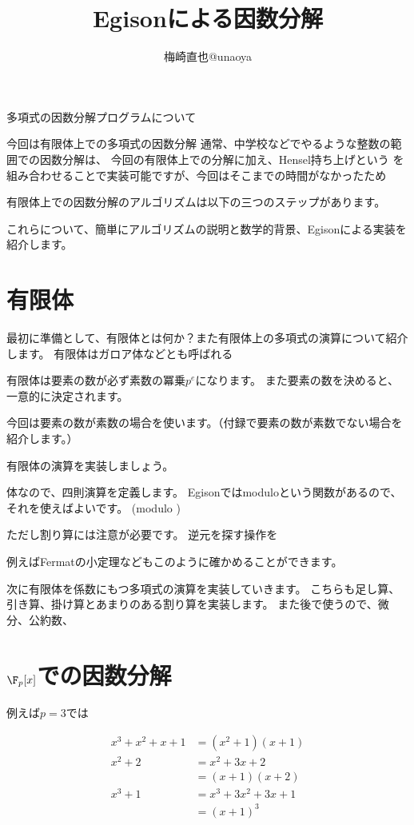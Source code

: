 \documentclass[uplatex]{jsarticle}
\title{Egisonによる因数分解}
\author{梅崎直也@unaoya}
\begin{document}
\maketitle


多項式の因数分解プログラムについて

今回は有限体上での多項式の因数分解
通常、中学校などでやるような整数の範囲での因数分解は、
今回の有限体上での分解に加え、Hensel持ち上げという
を組み合わせることで実装可能ですが、今回はそこまでの時間がなかったため

有限体上での因数分解のアルゴリズムは以下の三つのステップがあります。

これらについて、簡単にアルゴリズムの説明と数学的背景、Egisonによる実装を紹介します。

\section{有限体}
最初に準備として、有限体とは何か？また有限体上の多項式の演算について紹介します。
有限体はガロア体などとも呼ばれる

有限体は要素の数が必ず素数の冪乗$p^e$になります。
また要素の数を決めると、一意的に決定されます。

今回は要素の数が素数の場合を使います。（付録で要素の数が素数でない場合を紹介します。）

有限体の演算を実装しましょう。

体なので、四則演算を定義します。
Egisonではmoduloという関数があるので、それを使えばよいです。
(modulo )

ただし割り算には注意が必要です。
逆元を探す操作を

例えばFermatの小定理などもこのように確かめることができます。

次に有限体を係数にもつ多項式の演算を実装していきます。
こちらも足し算、引き算、掛け算とあまりのある割り算を実装します。
また後で使うので、微分、公約数、


\section{$\F_p[x]$での因数分解}
例えば$p=3$では

\begin{align*}
x^3+x^2+x+1&=(x^2+1)(x+1)\\
x^2+2&=x^2+3x+2\\&=(x+1)(x+2)\\
x^3+1&=x^3+3x^2+3x+1\\&=(x+1)^3
\end{align*}
\end{document}
